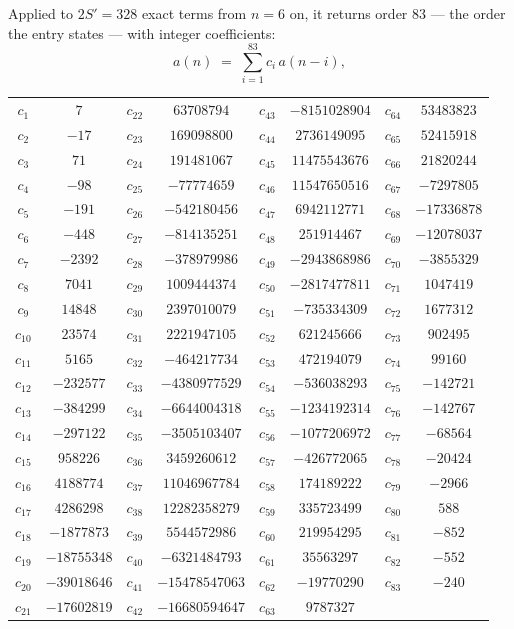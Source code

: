 \documentclass[11pt,a4paper]{article}
\theoremstyle{plain}
\theoremstyle{definition}
\begin{document}
Applied to $2S'=328$ exact terms from $n=6$ on, it returns order $83$ --- the
order the entry states --- with integer coefficients:
\[
a(n)\;=\;\sum_{i=1}^{83}c_i\,a(n-i),
\]
\begin{center}\small
\begin{tabular}{cccccccc}
$c_{1}$ & $7$ & $c_{22}$ & $63708794$ & $c_{43}$ & $-8151028904$ & $c_{64}$ & $53483823$ \\
$c_{2}$ & $-17$ & $c_{23}$ & $169098800$ & $c_{44}$ & $2736149095$ & $c_{65}$ & $52415918$ \\
$c_{3}$ & $71$ & $c_{24}$ & $191481067$ & $c_{45}$ & $11475543676$ & $c_{66}$ & $21820244$ \\
$c_{4}$ & $-98$ & $c_{25}$ & $-77774659$ & $c_{46}$ & $11547650516$ & $c_{67}$ & $-7297805$ \\
$c_{5}$ & $-191$ & $c_{26}$ & $-542180456$ & $c_{47}$ & $6942112771$ & $c_{68}$ & $-17336878$ \\
$c_{6}$ & $-448$ & $c_{27}$ & $-814135251$ & $c_{48}$ & $251914467$ & $c_{69}$ & $-12078037$ \\
$c_{7}$ & $-2392$ & $c_{28}$ & $-378979986$ & $c_{49}$ & $-2943868986$ & $c_{70}$ & $-3855329$ \\
$c_{8}$ & $7041$ & $c_{29}$ & $1009444374$ & $c_{50}$ & $-2817477811$ & $c_{71}$ & $1047419$ \\
$c_{9}$ & $14848$ & $c_{30}$ & $2397010079$ & $c_{51}$ & $-735334309$ & $c_{72}$ & $1677312$ \\
$c_{10}$ & $23574$ & $c_{31}$ & $2221947105$ & $c_{52}$ & $621245666$ & $c_{73}$ & $902495$ \\
$c_{11}$ & $5165$ & $c_{32}$ & $-464217734$ & $c_{53}$ & $472194079$ & $c_{74}$ & $99160$ \\
$c_{12}$ & $-232577$ & $c_{33}$ & $-4380977529$ & $c_{54}$ & $-536038293$ & $c_{75}$ & $-142721$ \\
$c_{13}$ & $-384299$ & $c_{34}$ & $-6644004318$ & $c_{55}$ & $-1234192314$ & $c_{76}$ & $-142767$ \\
$c_{14}$ & $-297122$ & $c_{35}$ & $-3505103407$ & $c_{56}$ & $-1077206972$ & $c_{77}$ & $-68564$ \\
$c_{15}$ & $958226$ & $c_{36}$ & $3459260612$ & $c_{57}$ & $-426772065$ & $c_{78}$ & $-20424$ \\
$c_{16}$ & $4188774$ & $c_{37}$ & $11046967784$ & $c_{58}$ & $174189222$ & $c_{79}$ & $-2966$ \\
$c_{17}$ & $4286298$ & $c_{38}$ & $12282358279$ & $c_{59}$ & $335723499$ & $c_{80}$ & $588$ \\
$c_{18}$ & $-1877873$ & $c_{39}$ & $5544572986$ & $c_{60}$ & $219954295$ & $c_{81}$ & $-852$ \\
$c_{19}$ & $-18755348$ & $c_{40}$ & $-6321484793$ & $c_{61}$ & $35563297$ & $c_{82}$ & $-552$ \\
$c_{20}$ & $-39018646$ & $c_{41}$ & $-15478547063$ & $c_{62}$ & $-19770290$ & $c_{83}$ & $-240$ \\
$c_{21}$ & $-17602819$ & $c_{42}$ & $-16680594647$ & $c_{63}$ & $9787327$ &  &  \\
\end{tabular}
\end{center}
\end{document}
